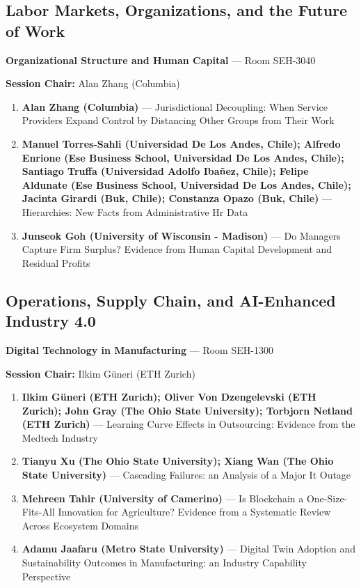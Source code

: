 \documentclass[
  10pt,
  letterpaper,
  DIV=11,
  numbers=noendperiod]{scrartcl}
\begin{document}
\subsection{\texorpdfstring{\textcolor{labor}{Labor Markets, Organizations, and the Future of Work}}{}}\label{section-3}

\textbf{Organizational Structure and Human Capital} --- Room SEH-3040

\textbf{Session Chair:} Alan Zhang (Columbia)

\begin{enumerate}
\def\labelenumi{\arabic{enumi}.}
\item
  \textbf{Alan Zhang (Columbia)} --- Jurisdictional Decoupling: When
  Service Providers Expand Control by Distancing Other Groups from Their
  Work
\item
  \textbf{Manuel Torres-Sahli (Universidad De Los Andes, Chile); Alfredo
  Enrione (Ese Business School, Universidad De Los Andes, Chile);
  Santiago Truffa (Universidad Adolfo Ibañez, Chile); Felipe Aldunate
  (Ese Business School, Universidad De Los Andes, Chile); Jacinta
  Girardi (Buk, Chile); Constanza Opazo (Buk, Chile)} --- Hierarchies:
  New Facts from Administrative Hr Data
\item
  \textbf{Junseok Goh (University of Wisconsin - Madison)} --- Do
  Managers Capture Firm Surplus? Evidence from Human Capital Development
  and Residual Profits
\end{enumerate}

\subsection{\texorpdfstring{\textcolor{operations}{Operations, Supply Chain, and AI-Enhanced Industry 4.0}}{}}\label{section-4}

\textbf{Digital Technology in Manufacturing} --- Room SEH-1300

\textbf{Session Chair:} Ilkim Güneri (ETH Zurich)

\begin{enumerate}
\def\labelenumi{\arabic{enumi}.}
\item
  \textbf{Ilkim Güneri (ETH Zurich); Oliver Von Dzengelevski (ETH
  Zurich); John Gray (The Ohio State University); Torbjorn Netland (ETH
  Zurich)} --- Learning Curve Effects in Outsourcing: Evidence from the
  Medtech Industry
\item
  \textbf{Tianyu Xu (The Ohio State University); Xiang Wan (The Ohio
  State University)} --- Cascading Failures: an Analysis of a Major It
  Outage
\item
  \textbf{Mehreen Tahir (University of Camerino)} --- Is Blockchain a
  One-Size-Fits-All Innovation for Agriculture? Evidence from a
  Systematic Review Across Ecosystem Domains
\item
  \textbf{Adamu Jaafaru (Metro State University)} --- Digital Twin
  Adoption and Sustainability Outcomes in Manufacturing: an Industry
  Capability Perspective
\end{enumerate}
\end{document}
